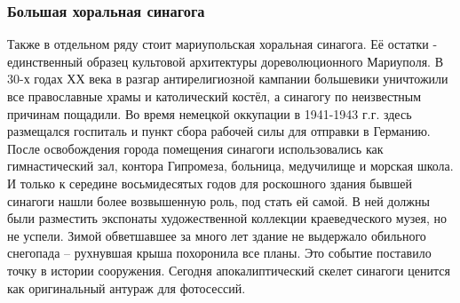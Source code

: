  
 
 
 
 

\subsubsection{Большая хоральная синагога}

Также в отдельном ряду стоит мариупольская хоральная синагога. Её остатки -
единственный образец культовой архитектуры дореволюционного Мариуполя. В 30-х
годах ХХ века в разгар антирелигиозной кампании большевики уничтожили все
православные храмы и католический костёл, а синагогу по неизвестным причинам
пощадили. Во время немецкой оккупации в 1941-1943 г.г. здесь размещался
госпиталь и пункт сбора рабочей силы для отправки в Германию. После
освобождения города помещения синагоги использовались как гимнастический зал,
контора Гипромеза, больница, медучилище и морская школа. И только к середине
восьмидесятых годов для роскошного здания бывшей синагоги нашли более
возвышенную роль, под стать ей самой. В ней должны были разместить экспонаты
художественной коллекции краеведческого музея, но не успели. Зимой обветшавшее
за много лет здание не выдержало обильного снегопада – рухнувшая крыша
похоронила все планы. Это событие поставило точку в истории сооружения. Сегодня
апокалиптический скелет синагоги ценится как оригинальный антураж для
фотосессий.

